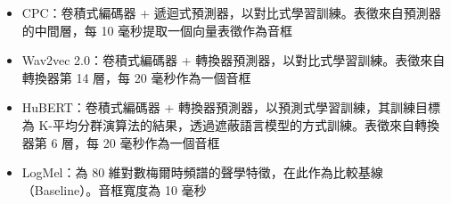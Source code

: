 \begin{itemize}
    \item CPC：卷積式編碼器 + 遞迴式預測器，以對比式學習訓練。表徵來自預測器的中間層，每 10 毫秒提取一個向量表徵作為音框
    \item Wav2vec 2.0：卷積式編碼器 + 轉換器預測器，以對比式學習訓練。表徵來自轉換器第 14 層，每 20 毫秒作為一個音框
    \item HuBERT：卷積式編碼器 + 轉換器預測器，以預測式學習訓練，其訓練目標為 K-平均分群演算法的結果，透過遮蔽語言模型的方式訓練。表徵來自轉換器第 6 層，每 20 毫秒作為一個音框
    \item LogMel：為 80 維對數梅爾時頻譜的聲學特徵，在此作為比較基線（Baseline）。音框寬度為 10 毫秒
    
\end{itemize}



